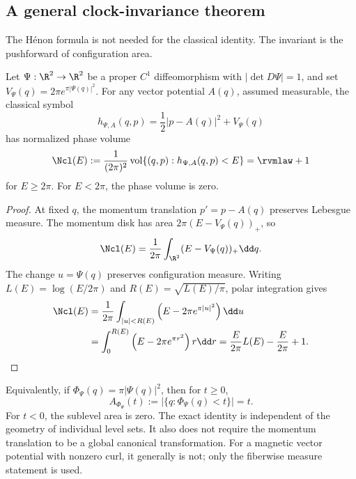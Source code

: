 \subsection{A general clock-invariance theorem}

The H\'enon formula is not needed for the classical identity.  The invariant
is the pushforward of configuration area.

\begin{theorem}
\label{thm:classical-clock}
Let \(\Psi:\R^2\to\R^2\) be a proper \(C^1\) diffeomorphism with
\(|\det D\Psi|=1\), and set
\(V_\Psi(q)=2\pi e^{\pi|\Psi(q)|^2}\).  For any vector potential \(A(q)\),
assumed measurable,
the classical symbol
\begin{equation}
 h_{\Psi,A}(q,p)=\frac12|p-A(q)|^2+V_\Psi(q)
\end{equation}
has normalized phase volume
\begin{equation}
 \Ncl(E)
 :=\frac{1}{(2\pi)^2}
 \operatorname{vol}\{(q,p):h_{\Psi,A}(q,p)<E\}
 =\rvmlaw+1
 \label{eq:exact-classical-clock}
\end{equation}
for \(E\ge2\pi\).  For \(E<2\pi\), the phase volume is zero.
\end{theorem}

\begin{proof}
At fixed \(q\), the momentum translation \(p'=p-A(q)\) preserves Lebesgue
measure.  The momentum disk has area \(2\pi(E-V_\Psi(q))_+\), so
\begin{equation}
 \Ncl(E)=\frac{1}{2\pi}\int_{\R^2}(E-V_\Psi(q))_+\dd q.
 \label{eq:momentum-reduction}
\end{equation}
The change \(u=\Psi(q)\) preserves configuration measure.  Writing
\(L(E)=\log(E/2\pi)\) and \(R(E)=\sqrt{L(E)/\pi}\), polar integration gives
\begin{align}
 \Ncl(E)
 &=\frac{1}{2\pi}\int_{|u|<R(E)}
       \left(E-2\pi e^{\pi|u|^2}\right)\dd u \\
 &=\int_0^{R(E)}\left(E-2\pi e^{\pi r^2}\right)r\dd r
 =\frac{E}{2\pi}L(E)-\frac{E}{2\pi}+1.
\end{align}
\end{proof}

Equivalently, if \(\Phi_\Psi(q)=\pi|\Psi(q)|^2\), then for \(t\geq0\),
\begin{equation}
 A_{\Phi_\Psi}(t)
 :=|\{q:\Phi_\Psi(q)<t\}|=t.
 \label{eq:sublevel-invariant}
\end{equation}
For \(t<0\), the sublevel area is zero.
The exact identity is independent of the geometry of individual level sets.
It also does not require the momentum translation to be a global canonical
transformation.  For a magnetic vector potential with nonzero curl, it
generally is not; only the fiberwise measure statement is used.

